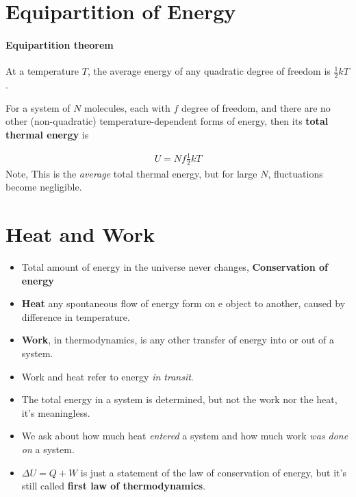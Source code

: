 \documentclass{book}
\begin{document}
\section{Equipartition of Energy}%
\label{sec:equi of energy}

\paragraph{Equipartition theorem} At a temperature $T$, the average energy of any
quadratic degree of freedom is $\frac{1}{2}kT$.

For a system of $N$ molecules, each with $f$ degree of freedom, and there are no other
(non-quadratic) temperature-dependent forms of energy, then its \textbf{total thermal energy} is

\begin{align}
U = Nf \frac{1}{2}kT
\end{align}
Note, This is the \textit{average} total thermal energy,
but for large $N$, fluctuations become negligible.


\section{Heat and Work}%
\label{sec:heat and work}

\begin{itemize}
  \item Total amount of energy in the universe never changes, \textbf{Conservation of energy}
  \item \textbf{Heat} any spontaneous flow of energy form on e object to another, caused by
        difference in temperature.
  \item \textbf{Work}, in thermodynamics, is any other transfer of energy into or out of a system.
  \item Work and heat refer to energy \textit{in transit}.
  \item The total energy in a system is determined, but not the work nor the heat, it's meaningless.
  \item We ask about how much heat \textit{entered} a system and how much work
        \textit{was done on} a system.
  \item $\Delta{U} = Q + W$
        is just a statement of the law of conservation of energy, but it's still called
        \textbf{first law of thermodynamics}.
\end{itemize}
\end{document}
